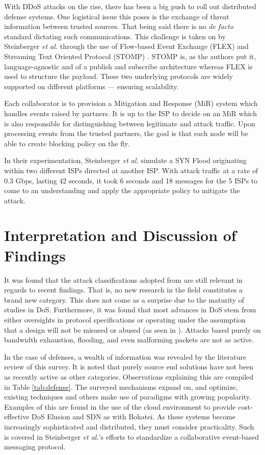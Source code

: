 \documentclass[conference]{IEEEtran}
\begin{document}
With DDoS attacks on the rise, there has been a big push to roll out distributed defense systems. One logistical issue this poses is the exchange of threat information between trusted sources. That being said there is no \textit{de facto} standard dictating such communications. This challenge is taken on by Steinberger \textit{et al.} through the use of Flow-based Event Exchange (FLEX) and Streaming Text Oriented Protocol (STOMP) \cite{Steinberger:FLEX}. STOMP is, as the authors put it, language-agnostic and of a publish and subscribe architecture whereas FLEX is used to structure the payload. These two underlying protocols are widely supported on different platforms --- ensuring scalability. 

Each collaborator is to provision a Mitigation and Response (MiR) system which handles events raised by partners. It is up to the ISP to decide on an MiR which is also responsible for distinguishing between legitimate and attack traffic. Upon processing events from the trusted partners, the goal is that each node will be able to create blocking policy on the fly.

In their experimentation, Steinberger \textit{et al.} simulate a SYN Flood originating within two different ISPs directed at another ISP. With attack traffic at a rate of 0.3 Gbps, lasting 42 seconds, it took 6 seconds and 18 messages for the 5 ISPs to come to an understanding and apply the appropriate policy to mitigate the attack.

\section{Interpretation and Discussion of Findings}

It was found that the attack classifications adopted from \cite{Botnet:Hoque,Zargar:DDOSFlood} are still relevant in regards to recent findings. That is, no new research in the field constitutes a brand new category. This does not come as a surprise due to the maturity of studies in DoS. Furthermore, it was found that most advances in DoS stem from either oversights in protocol specifications or operating under the assumption that a design will not be misused or abused (as seen in \cite{DoSTCPAnalysis:Schuba,Li:LAAEM,OffPath:Cao}). Attacks based purely on bandwidth exhaustion, flooding, and even malforming packets are not as active.

In the case of defenses, a wealth of information was revealed by the literature review of this survey. It is noted that purely source end solutions have not been as recently active as other categories. Observations explaining this are compiled in Table \ref{tab:defense}. The surveyed mechanisms expand on, and optimize, existing techniques and others make use of paradigms with growing popularity. Examples of this are found in the use of the cloud environment to provide cost-effective DoS Elusion and SDN as with Bohatei. As these systems become increasingly sophisticated and distributed, they must consider practicality. Such is covered in Steinberger \textit{et al.}'s efforts to standardize a collaborative event-based messaging protocol.
\end{document}
